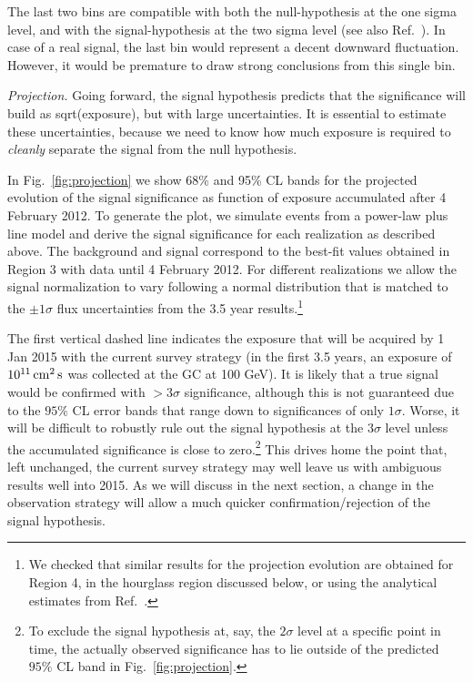 \documentclass[aps,prd,superscriptaddress,nofootinbib,fixlfloat, 12pt]{revtex4-1}
\begin{document}
The last two bins are compatible with both the null-hypothesis at the one
sigma level, and with the signal-hypothesis at the two sigma level (see also
Ref.~\cite{Weniger:2013dya}). In case of a real signal, the last bin would
represent a decent downward fluctuation. However, it would be premature to
draw strong conclusions from this single bin.

\emph{Projection.} 
Going forward, the signal hypothesis predicts that the significance will build
as sqrt(exposure), but with large uncertainties.  It is essential to estimate
these uncertainties, because we need to know how much exposure is required to
\emph{cleanly} separate the signal from the null hypothesis. 

In Fig.~\ref{fig:projection} we show 68\% and 95\% CL bands for the projected evolution of the
signal significance as function of exposure accumulated after 4 February 2012.
To generate the plot, we simulate events from a power-law plus line model and
derive the signal significance for each realization as described above. The
background and signal correspond to the best-fit values obtained in Region 3
with data until 4 February 2012.  For different realizations we allow the
signal normalization to vary following a normal distribution that is matched
to the $\pm1\sigma$ flux uncertainties from the 3.5 year results.\footnote{We
checked that similar results for the projection evolution are obtained for
Region 4, in the hourglass region discussed below, or using the analytical
estimates from Ref.~\cite{Weniger:2013dya}.}

The first vertical dashed line indicates the exposure that will be acquired by
1 Jan 2015 with the current survey strategy (in the first 3.5 years, an
exposure of $10^{11}\rm\,cm^2\,s$ was collected at the GC at 100 GeV). It is likely that a true signal
would be confirmed with $>3\sigma$ significance, although this is not
guaranteed due to the $95\%$ CL error bands that range down to significances
of only $1\sigma$. Worse, it will be difficult to robustly rule out the signal
hypothesis at the $3\sigma$ level unless the accumulated significance is close
to zero.\footnote{To exclude the signal hypothesis at, say, the $2\sigma$ level at a
specific point in time, the actually observed significance has to lie outside
of the predicted
$95\%$ CL band in Fig.~\ref{fig:projection}.} This drives home the point
that, left unchanged, the current survey
strategy may well leave us with ambiguous results well into 2015.  As we will
discuss in the next section, a change in the observation strategy will allow a
much quicker confirmation/rejection of the signal hypothesis.
\medskip
\end{document}
